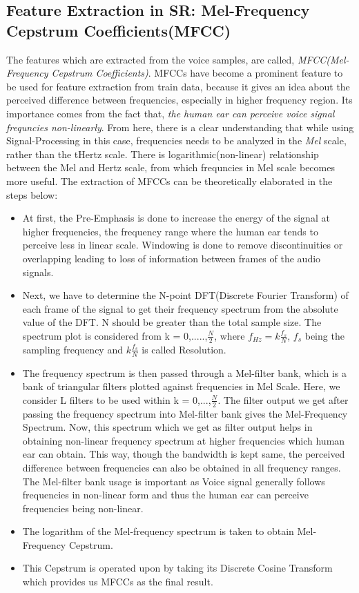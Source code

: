 \documentclass{article}
\begin{document}
\subsection{Feature Extraction in SR: Mel-Frequency Cepstrum Coefficients(MFCC)}
The features which are extracted from the voice samples, are called, \textit{MFCC(Mel-Frequency Cepstrum Coefficients)}. MFCCs have become a prominent feature to be used for feature extraction from train data, because it gives an idea about the perceived difference between frequencies, especially in higher frequency region. Its importance comes from the fact that, \textit{the human ear can perceive voice signal frequncies non-linearly}. From here, there is a clear understanding that while using Signal-Processing in this case, frequencies needs to be analyzed in the \textit{Mel} scale, rather than the t{Hertz} scale. There is logarithmic(non-linear) relationship between the Mel and Hertz scale, from which frequncies in Mel scale becomes more useful. The extraction of MFCCs can be theoretically elaborated in the steps below:
\begin{itemize}
\item At first, the Pre-Emphasis is done to increase the energy of the signal at higher frequencies, the frequency range where the human ear tends to perceive less in linear scale. Windowing is done to remove discontinuities or overlapping leading to loss of information between frames of the audio signals.
\item Next, we have to determine the N-point DFT(Discrete Fourier Transform) of each frame of the signal to get their frequency spectrum from the absolute value of the DFT. N should be greater than the total sample size. The spectrum plot is considered from k = 0,.....,$\frac{N}{2}$, where $f_{Hz} = k\frac{f_s}{N}$, $f_s$ being the sampling frequency and $k\frac{f_s}{N}$ is called Resolution.
\item The frequency spectrum is then passed through a Mel-filter bank, which is a bank of triangular filters plotted against frequencies in Mel Scale. Here, we consider L filters to be used within k = 0,...,$\frac{N}{2}$. The filter output we get after passing the frequency spectrum into Mel-filter bank gives the Mel-Frequency Spectrum. Now, this spectrum which we get as filter output helps in obtaining non-linear frequency spectrum at higher frequencies which human ear can obtain. This way, though the bandwidth is kept same, the perceived difference between frequencies can also be obtained in all frequency ranges. The Mel-filter bank usage is important as Voice signal generally follows frequencies in non-linear form and thus the human ear can perceive frequencies being non-linear.
\item The logarithm of the Mel-frequency spectrum is taken to obtain Mel-Frequency Cepstrum.
\item This Cepstrum is operated upon by taking its Discrete Cosine Transform which provides us MFCCs as the final result.
\end{itemize}
\end{document}
